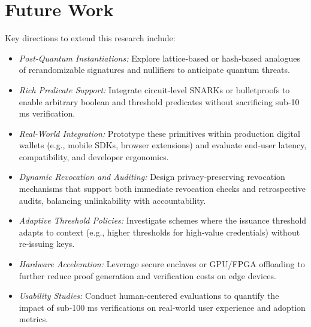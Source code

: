 \section{Future Work}
Key directions to extend this research include:
\begin{itemize}
  \item \emph{Post‐Quantum Instantiations:} Explore lattice‐based or hash‐based analogues of rerandomizable signatures and nullifiers to anticipate quantum threats.
  \item \emph{Rich Predicate Support:} Integrate circuit‐level SNARKs or bulletproofs to enable arbitrary boolean and threshold predicates without sacrificing sub‐10 ms verification.
  \item \emph{Real‐World Integration:} Prototype these primitives within production digital wallets (e.g., mobile SDKs, browser extensions) and evaluate end‐user latency, compatibility, and developer ergonomics.
  \item \emph{Dynamic Revocation and Auditing:} Design privacy‐preserving revocation mechanisms that support both immediate revocation checks and retrospective audits, balancing unlinkability with accountability.
  \item \emph{Adaptive Threshold Policies:} Investigate schemes where the issuance threshold adapts to context (e.g., higher thresholds for high‐value credentials) without re‐issuing keys.
  \item \emph{Hardware Acceleration:} Leverage secure enclaves or GPU/FPGA offloading to further reduce proof generation and verification costs on edge devices.
  \item \emph{Usability Studies:} Conduct human‐centered evaluations to quantify the impact of sub‐100 ms verifications on real‐world user experience and adoption metrics.
\end{itemize}

\clearpage
